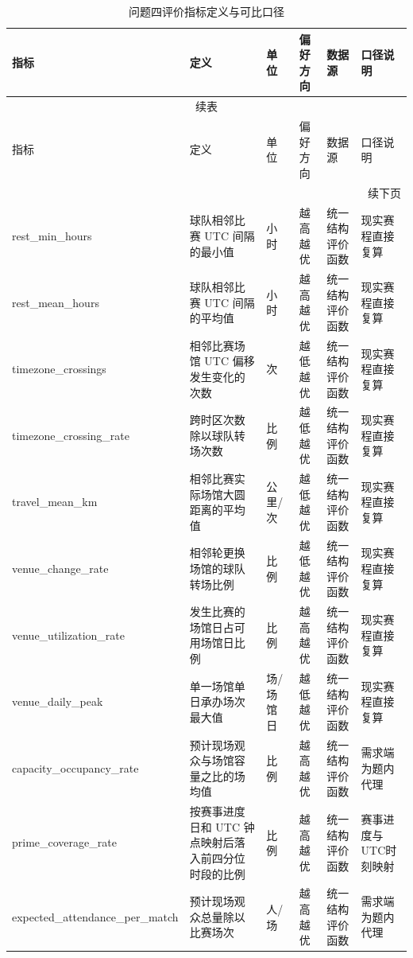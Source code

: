 {
\footnotesize
\hfuzz=0.2pt
\setlength{\tabcolsep}{3pt}
\begin{longtable}{@{}p{}p{}p{}p{}p{}p{}@{}}
\caption{问题四评价指标定义与可比口径}\label{tab:q4-metric-definition}\\
\toprule
指标 & 定义 & 单位 & 偏好方向 & 数据源 & 口径说明 \\
\midrule
\endfirsthead
\multicolumn{6}{c}{续表} \\
\toprule
指标 & 定义 & 单位 & 偏好方向 & 数据源 & 口径说明 \\
\midrule
\endhead
\midrule \multicolumn{6}{r}{续下页} \\
\endfoot
\bottomrule
\endlastfoot
rest\_\allowbreak{}min\_\allowbreak{}hours & 球队相邻比赛 UTC 间隔的最小值 & 小时 & 越高越优 & 统一结构评价函数 & 现实赛程直接复算 \\
rest\_\allowbreak{}mean\_\allowbreak{}hours & 球队相邻比赛 UTC 间隔的平均值 & 小时 & 越高越优 & 统一结构评价函数 & 现实赛程直接复算 \\
timezone\_\allowbreak{}crossings & 相邻比赛场馆 UTC 偏移发生变化的次数 & 次 & 越低越优 & 统一结构评价函数 & 现实赛程直接复算 \\
timezone\_\allowbreak{}crossing\_\allowbreak{}rate & 跨时区次数除以球队转场次数 & 比例 & 越低越优 & 统一结构评价函数 & 现实赛程直接复算 \\
travel\_\allowbreak{}mean\_\allowbreak{}km & 相邻比赛实际场馆大圆距离的平均值 & 公里/次 & 越低越优 & 统一结构评价函数 & 现实赛程直接复算 \\
venue\_\allowbreak{}change\_\allowbreak{}rate & 相邻轮更换场馆的球队转场比例 & 比例 & 越低越优 & 统一结构评价函数 & 现实赛程直接复算 \\
venue\_\allowbreak{}utilization\_\allowbreak{}rate & 发生比赛的场馆日占可用场馆日比例 & 比例 & 越高越优 & 统一结构评价函数 & 现实赛程直接复算 \\
venue\_\allowbreak{}daily\_\allowbreak{}peak & 单一场馆单日承办场次最大值 & 场/场馆日 & 越低越优 & 统一结构评价函数 & 现实赛程直接复算 \\
capacity\_\allowbreak{}occupancy\_\allowbreak{}rate & 预计现场观众与场馆容量之比的场均值 & 比例 & 越高越优 & 统一结构评价函数 & 需求端为题内代理 \\
prime\_\allowbreak{}coverage\_\allowbreak{}rate & 按赛事进度日和 UTC 钟点映射后落入前四分位时段的比例 & 比例 & 越高越优 & 统一结构评价函数 & 赛事进度与UTC时刻映射 \\
expected\_\allowbreak{}attendance\_\allowbreak{}per\_\allowbreak{}match & 预计现场观众总量除以比赛场次 & 人/场 & 越高越优 & 统一结构评价函数 & 需求端为题内代理 \\

\end{longtable}}

